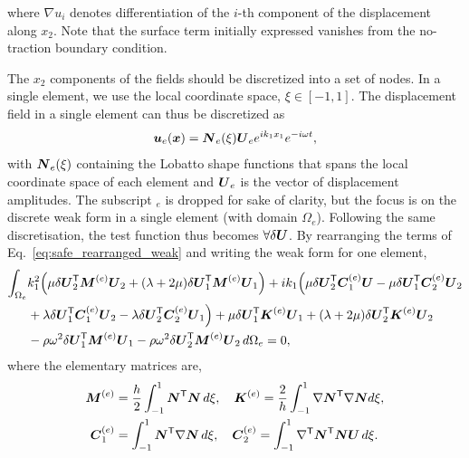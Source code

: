 where $\nabla u_i$ denotes differentiation of the $i$-th component of the displacement along $x_2$. Note that the surface term initially expressed vanishes from the no-traction boundary condition.

The $x_2$ components of the fields should be discretized into a set of nodes. In a single element, we use the local coordinate space, $\xi \in [-1, 1]$. The displacement field in a single element can thus be discretized as
\begin{equation}
    \boldsymbol u_e (\boldsymbol x) =\boldsymbol N_e (\xi) \boldsymbol U_e e^{ik_1 x_1}e^{-i\omega t},
\end{equation}
with $\boldsymbol N_e(\xi)$ containing the Lobatto shape functions that spans the local coordinate space of each element and $\boldsymbol U_e$ is the vector of displacement amplitudes. The subscript $_e$ is dropped for sake of clarity, but the focus is on the discrete weak form in a single element (with domain $\Omega_e$). Following the same discretisation, the test function thus becomes $\forall \delta \boldsymbol U$. By rearranging the terms of Eq.~\ref{eq:safe_rearranged_weak} and writing the weak form for one element, 
\begin{equation}
    \begin{aligned}
        \int_{\Omega_e} & k_1^2 \Big(
         \mu \delta \boldsymbol U_2^\mathsf T \boldsymbol M^{(e)} \boldsymbol U_2
        + (\lambda + 2\mu) \delta \boldsymbol U_1^\mathsf T \boldsymbol M^{(e)} \boldsymbol U_1\Big)
        + ik_1 \Big( \mu \delta \boldsymbol U_2^\mathsf T \boldsymbol C_1^{(e)} \boldsymbol U
        - \mu \delta \boldsymbol U_1^\mathsf T \boldsymbol C_2^{(e)} \boldsymbol U_2 \\ &
        + \lambda \delta \boldsymbol U_1^\mathsf T \boldsymbol C_1^{(e)} \boldsymbol U_2
        - \lambda \delta \boldsymbol U_2^\mathsf T \boldsymbol C_2^{(e)} \boldsymbol U_1 \Big)
        + \mu \delta \boldsymbol U_1^\mathsf T \boldsymbol K^{(e)} \boldsymbol U_1
        + (\lambda + 2\mu) \delta \boldsymbol U_2^\mathsf T \boldsymbol K^{(e)} \boldsymbol U_2 
        \\ &-\rho \omega^2 \delta \boldsymbol U_1^\mathsf T \boldsymbol M^{(e)} \boldsymbol U_1 -\rho \omega^2 \delta \boldsymbol U_2^\mathsf T \boldsymbol M^{(e)} \boldsymbol U_2 \,d\Omega_e = 0,
    \end{aligned}
    \label{eq:safe_full_weakform}
\end{equation}
where the elementary matrices are, 
\begin{equation}
    \begin{aligned}
        \boldsymbol M^{(e)}   &= \frac{h}{2} \int_{-1}^1 \boldsymbol N^\mathsf T \boldsymbol N \,d\xi, \quad
        \boldsymbol K^{(e)}   = \frac 2 h \int_{-1}^1 \nabla \boldsymbol N^{\mathsf T} \nabla \boldsymbol N d\xi,\\
        \boldsymbol C_1^{(e)} &= \int_{-1}^1 \boldsymbol N^{\mathsf T}\nabla \boldsymbol N \,d\xi, \quad
        \boldsymbol C_2^{(e)} = \int_{-1}^1 \nabla^\mathsf T \boldsymbol N^{\mathsf T} \boldsymbol N \boldsymbol U\,d\xi.\\
    \end{aligned}
\end{equation}
